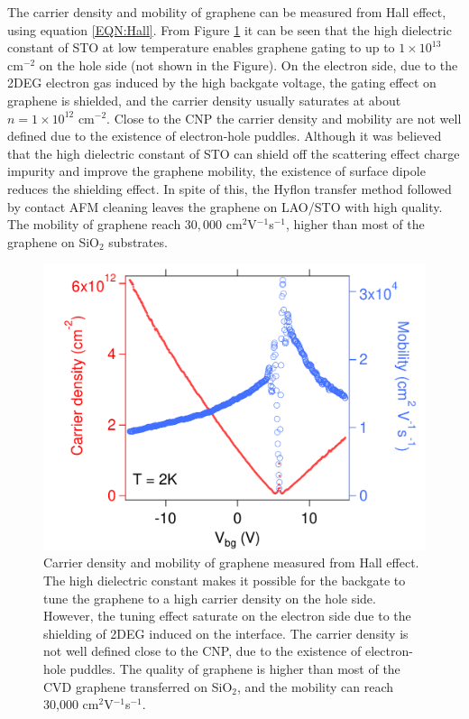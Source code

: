 \documentclass[pdflatex, sectionletters, 12pt]{pittetd}    %
\begin{document}
The carrier density and mobility of graphene can be measured from Hall effect, using equation \ref{EQN:Hall}. From Figure \ref{FIG:CarrierDensityMobility} it can be seen that the high dielectric constant of STO at low temperature enables graphene gating to up to $1 \times 10^{13}$ $\mathrm{cm}^{-2}$ on the hole side (not shown in the Figure). On the electron side, due to the 2DEG electron gas induced by the high backgate voltage, the gating effect on graphene is shielded, and the carrier density usually saturates at about $n = 1 \times 10^{12}$ $\mathrm{cm}^{-2}$. Close to the CNP the carrier density and mobility are not well defined due to the existence of electron-hole puddles. Although it was believed that the high dielectric constant of STO can shield off the scattering effect charge impurity and improve the graphene mobility, the existence of surface dipole reduces the shielding effect\cite{sachs2014ferroelectric}. In spite of this, the Hyflon transfer method followed by contact AFM cleaning leaves the graphene on LAO/STO with high quality. The mobility of graphene reach $30,000$ cm$^{2}$V$^{-1}$s$^{-1}$, higher than most of the graphene on SiO$_2$ substrates. 
\\

\begin{figure}[h!]
	\centering
	\includegraphics[width=.7\textwidth]{Drawing/CarrierDensityMobility.pdf}
	\caption{Carrier density and mobility of graphene measured from Hall effect. The high dielectric constant makes it possible for the backgate to tune the graphene to a high carrier density on the hole side. However, the tuning effect saturate on the electron side due to the shielding of 2DEG induced on the interface. The carrier density is not well defined close to the CNP, due to the existence of electron-hole puddles. The quality of graphene is higher than most of the CVD graphene transferred on SiO$_2$, and the mobility can reach 30,000 cm$^2$V$^{-1}$s$^{-1}$.}
	\label{FIG:CarrierDensityMobility}
\end{figure}
\end{document}
